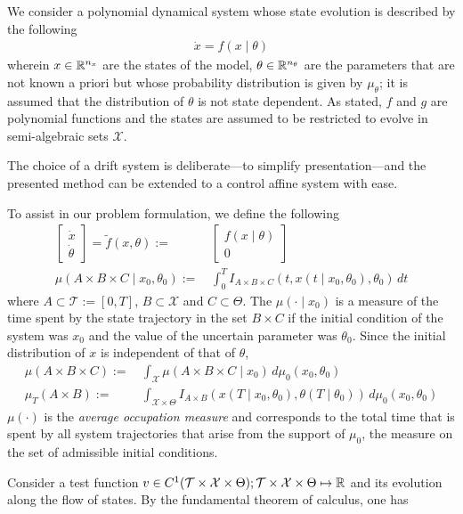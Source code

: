 \documentclass[10pt]{scrartcl}
\theoremstyle{remark}
\providecommand{\R}{\ensuremath \mathbb{R}}
\begin{document}
We consider a polynomial dynamical system whose state evolution is described by the following
\begin{align}
	\dot x=f(x\mid\theta)
\end{align}
wherein $x\in \R^{n_x}$ are the states of the model, $\theta\in \R^{n_\theta}$ are the parameters that are not known a priori but whose probability distribution is given by $\mu_{\theta}$; it is assumed that the distribution of $\theta$ is not state dependent. As stated, $f$ and $g$ are polynomial functions and the states are assumed to be restricted to evolve in semi-algebraic sets $\mathcal X$.
\par
The choice of a drift system is deliberate---to simplify presentation---and the presented method can be extended to a control affine system with ease.
\par
To assist in our problem formulation, we define the following
\begin{align}
\begin{bmatrix}\dot x\\\dot\theta\end{bmatrix}=\tilde f(x,\theta):=&\,\begin{bmatrix}f(x\mid\theta)\\0
\end{bmatrix}\\
	\mu(A\times B\times C\mid x_0,\theta_0):=&\,\int_{0}^T I_{A\times B\times C}(t,x(t\mid x_0,\theta_0),\theta_0) \,dt
\end{align}
where $A\subset \mathcal T:=[0,T]$, $B\subset \mathcal X$ and $C\subset \Theta$. The $\mu(\cdot\mid x_0)$ is a measure of the time spent by the state trajectory in the set $B\times C$ if the initial condition of the system was $x_0$ and the value of the uncertain parameter was $\theta_0$. Since the initial distribution of $x$ is independent of that of $\theta$,
\begin{align}
	\mu(A\times B\times C):=&\,\int_{\mathcal X} \mu(A\times B\times C\mid x_0) \,d\mu_0(x_0,\theta_0)\\
	\mu_T(A\times B):=&\,\int_{\mathcal X\times \Theta}I_{A\times B}(x(T\mid x_0,\theta_0),\theta(T\mid \theta_0))\,d\mu_0(x_0,\theta_0)
\end{align}
$\mu(\cdot)$ is the \emph{average occupation measure} and corresponds to the total time that is spent by all system trajectories that arise from the support of $\mu_0$, the measure on the set of admissible initial conditions.
\par
Consider a test function $v\in C^1(\mathcal T\times \mathcal X\times \Theta); \mathcal T\times \mathcal X\times \Theta\mapsto \R$ and its evolution along the flow of states. By the fundamental theorem of calculus, one has
\end{document}
